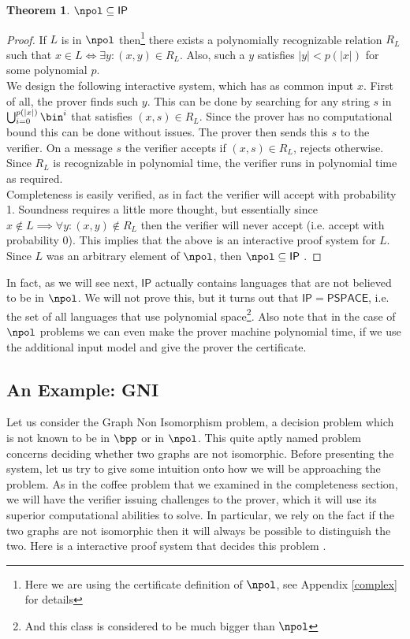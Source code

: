 \documentclass{article}
\newtheorem{theorem}{Theorem}
\begin{document}
\begin{theorem}
    $\npol \subseteq \mathsf{IP}$
\end{theorem}
\begin{proof}
    If $L$ is in $\npol$ then\footnote{Here we are using the certificate definition of $\npol$, see Appendix \ref{complex} for details} there exists a polynomially recognizable relation $R_L$ such that $x \in L \iff \exists y : (x, y) \in R_L$. Also, such a $y$ satisfies $|y| < p(|x|)$ for some polynomial $p$. \\
    We design the following interactive system, which has as common input $x$.
    First of all, the prover finds such $y$. This can be done by searching for any string $s$ in $ \bigcup_{i = 0}^{p(|x|)} \bin^i$ that satisfies $(x, s) \in R_L$. Since the prover has no computational bound this can be done without issues. The prover then sends this $s$ to the verifier. On a message $s$ the verifier accepts if $(x, s) \in R_L$, rejects otherwise. Since $R_L$ is recognizable in polynomial time, the verifier runs in polynomial time as required.  \\
    Completeness is easily verified, as in fact the verifier will accept with probability 1. Soundness requires a little more thought, but essentially since $x \notin L \implies \forall y : (x, y) \notin R_L $ then the verifier will never accept (i.e. accept with probability 0). This implies that the above is an interactive proof system for $L$. Since $L$ was an arbitrary element of $\npol$, then $\npol \subseteq \mathsf{IP}$ .
\end{proof}
In fact, as we will see next, $\mathsf{IP}$ actually contains languages that are not believed to be in $\npol$. We will not prove this, but it turns out that $\mathsf{IP} = \mathsf{PSPACE}$\cite{shamirIPPSPACE1992}, i.e. the set of all languages that use polynomial space\footnote{And this class is considered to be much bigger than $\npol$}. Also note that in the case of $\npol$ problems we can even make the prover machine polynomial time, if we use the additional input model and give the prover the certificate.
\subsection{An Example: GNI}
Let us consider the Graph Non Isomorphism problem, a decision problem which is not known to be in $\bpp$ or in $\npol$. This quite aptly named problem concerns deciding whether two graphs are not isomorphic.
Before presenting the system, let us try to give some intuition onto how we will be approaching the problem. As in the coffee problem that we examined in the completeness section, we will have the verifier issuing challenges to the prover, which it will use its superior computational abilities to solve. In particular, we rely on the fact if the two graphs are not isomorphic then it will always be possible to distinguish the two.
Here is a interactive proof system that decides this problem \cite{goldreichProofsThatYield1991}.
\end{document}
